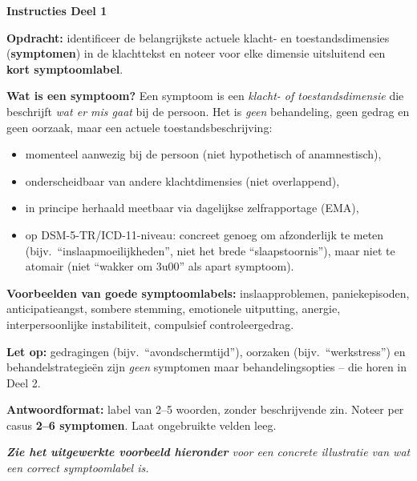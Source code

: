 \documentclass[11pt,a4paper]{article}
\begin{document}
\begin{tcolorbox}[colback=blue!3,colframe=PrimaryBlue,arc=2.5mm,boxrule=0.9pt,
  left=10pt,right=10pt,top=9pt,bottom=9pt]
\textbf{\color{PrimaryBlue}Instructies Deel 1}

\smallskip\small
\textbf{Opdracht:} identificeer de belangrijkste actuele klacht- en toestandsdimensies
(\textbf{symptomen}) in de klachttekst en noteer voor elke dimensie uitsluitend een
\textbf{kort symptoomlabel}.

\textbf{Wat is een symptoom?}
Een symptoom is een \emph{klacht- of toestandsdimensie} die beschrijft \emph{wat er
mis gaat} bij de persoon. Het is \emph{geen} behandeling, geen gedrag en geen oorzaak,
maar een actuele toestandsbeschrijving:
\begin{itemize}[topsep=2pt,itemsep=1pt]
\item momenteel aanwezig bij de persoon (niet hypothetisch of anamnestisch),
\item onderscheidbaar van andere klachtdimensies (niet overlappend),
\item in principe herhaald meetbaar via dagelijkse zelfrapportage (EMA),
\item op DSM-5-TR/ICD-11-niveau: concreet genoeg om afzonderlijk te meten (bijv.\ ``inslaapmoeilijkheden'', niet het brede ``slaapstoornis''), maar niet te atomair (niet ``wakker om 3u00'' als apart symptoom).
\end{itemize}

\textbf{Voorbeelden van goede symptoomlabels:}
inslaapproblemen, paniekepisoden, anticipatieangst, sombere stemming, emotionele uitputting,
anergie, interpersoonlijke instabiliteit, compulsief controleergedrag.

\textbf{Let op:} gedragingen (bijv.\ ``avondschermtijd''), oorzaken (bijv.\ ``werkstress'')
en behandelstrategieën zijn \emph{geen} symptomen maar behandelingsopties -- die horen in Deel 2.

\textbf{Antwoordformat:} label van 2--5 woorden, zonder beschrijvende zin.
Noteer per casus \textbf{2--6 symptomen}. Laat ongebruikte velden leeg.

\medskip
\textit{\textbf{Zie het uitgewerkte voorbeeld hieronder} voor een concrete illustratie van wat een correct symptoomlabel is.}
\end{tcolorbox}

\vspace{0.5em}
\nopagebreak[4]
\end{document}
